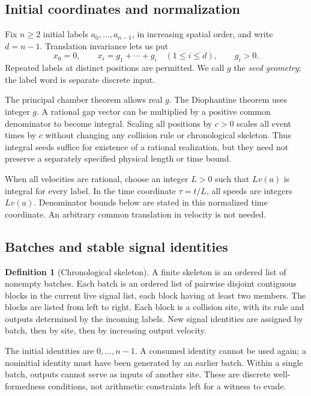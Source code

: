 \documentclass[11pt,letterpaper]{article}
\numberwithin{equation}{section}
\theoremstyle{definition}
\newtheorem{definition}[theorem]{Definition}
\theoremstyle{remark}
\begin{document}
\subsection{Initial coordinates and normalization}

Fix $n\ge2$ initial labels $a_0,\ldots,a_{n-1}$, in increasing spatial order,
and write $d=n-1$. Translation invariance lets us put
\begin{equation}
 x_0=0,\qquad x_i=g_1+\cdots+g_i\quad(1\le i\le d),
 \qquad g_i>0.
 \label{smc:cg:eq:gaps}
\end{equation}
Repeated labels at distinct positions are permitted. We call $g$ the
\emph{seed geometry}; the label word is separate discrete input.

The principal chamber theorem allows real $g$. The Diophantine theorem uses
integer $g$. A rational gap vector can be multiplied by a positive common
denominator to become integral. Scaling all positions by $c>0$ scales all
event times by $c$ without changing any collision rule or chronological
skeleton. Thus integral seeds suffice for existence of a rational
realization, but they need not preserve a separately specified physical
length or time bound.

When all velocities are rational, choose an integer $L>0$ such that $Lv(a)$
is integral for every label. In the time coordinate $\tau=t/L$, all speeds
are integers $Lv(a)$. Denominator bounds below are stated in this normalized
time coordinate. An arbitrary common translation in velocity is not needed.

\subsection{Batches and stable signal identities}

\begin{definition}[Chronological skeleton]
A finite skeleton is an ordered list of nonempty batches. Each batch is an
ordered list of pairwise disjoint contiguous blocks in the current live
signal list, each block having at least two members. The blocks are listed
from left to right. Each block is a collision site, with its rule and outputs
determined by the incoming labels. New signal identities are assigned by
batch, then by site, then by increasing output velocity.
\end{definition}

The initial identities are $0,\ldots,n-1$. A consumed identity cannot be used
again; a noninitial identity must have been generated by an earlier batch.
Within a single batch, outputs cannot serve as inputs of another site.
These are discrete well-formedness conditions, not arithmetic constraints
left for a witness to evade.
\end{document}
